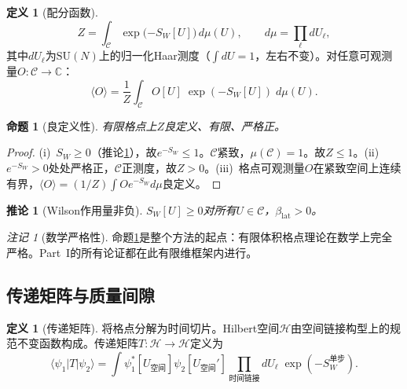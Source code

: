 \documentclass[12pt,a4paper]{article}
\theoremstyle{plain}
\newtheorem{corollary}[theorem]{推论}
\newtheorem{proposition}[theorem]{命题}
\theoremstyle{definition}
\newtheorem{definition}[theorem]{定义}
\theoremstyle{remark}
\newtheorem{remark}[theorem]{注记}
\begin{document}
\begin{definition}[配分函数]\label{def:Z}
\begin{equation}\label{eq:Z}
Z = \int_{\mathcal{C}} \exp\!\bigl({-S_W[U]}\bigr)\,d\mu(U), \qquad d\mu = \prod_\ell dU_\ell,
\end{equation}
其中$dU_\ell$为$\mathrm{SU}(N)$上的归一化Haar测度（$\int dU=1$，左右不变）。对任意可观测量$O:\mathcal{C}\to\mathbb{C}$：
\begin{equation}
\langle O \rangle = \frac{1}{Z}\int_{\mathcal{C}} O[U]\;\exp({-S_W[U]})\;d\mu(U).
\end{equation}
\end{definition}

\begin{proposition}[良定义性]\label{prop:wd}
有限格点上$Z$良定义、有限、严格正。
\end{proposition}

\begin{proof}
(i)~$S_W\geq 0$（推论\ref{cor:SWnonneg}），故$e^{-S_W}\leq 1$。$\mathcal{C}$紧致，$\mu(\mathcal{C})=1$。故$Z\leq 1$。(ii)~$e^{-S_W}>0$处处严格正，$\mathcal{C}$正测度，故$Z>0$。(iii)~格点可观测量$O$在紧致空间上连续有界，$\langle O\rangle=(1/Z)\int Oe^{-S_W}d\mu$良定义。
\end{proof}

\begin{corollary}[Wilson作用量非负]\label{cor:SWnonneg}
$S_W[U]\geq 0$对所有$U\in\mathcal{C}$，$\beta_{\mathrm{lat}}>0$。
\end{corollary}

\begin{remark}[数学严格性]
命题\ref{prop:wd}是整个方法的起点：有限体积格点理论在数学上完全严格。Part~I的所有论证都在此有限维框架内进行。
\end{remark}

\subsection{传递矩阵与质量间隙}\label{sec:transfer}

\begin{definition}[传递矩阵]\label{def:transfer}
将格点分解为时间切片。Hilbert空间$\mathcal{H}$由空间链接构型上的规范不变函数构成。传递矩阵$T:\mathcal{H}\to\mathcal{H}$定义为
\begin{equation}
\langle\psi_1|T|\psi_2\rangle = \int \psi_1^*[U_{\text{空间}}]\psi_2[U_{\text{空间}}']\prod_{\text{时间链接}}dU_\ell\;\exp(-S_W^{\text{单步}}).
\end{equation}
\end{definition}
\end{document}
